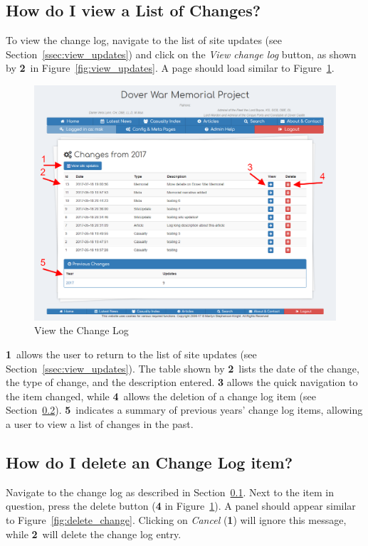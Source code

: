 \documentclass[12pt]{article}
\newcommand{\marker}[1]{\color{red}\textbf{#1}\color{black}}
\begin{document}
\newpage
\FloatBarrier
\subsection{How do I view a List of Changes?}\label{ssec:changeLog}
To view the change log, navigate to the list of site updates (see Section~\ref{ssec:view_updates}) and click on the \textit{View change log} button, as shown by \marker{2}\ in Figure~\ref{fig:view_updates}. A page should load similar to Figure~\ref{fig:view_changes}.

\begin{figure}[h]
  \centering
 \includegraphics[width=.9\textwidth]{pics/view_changes.png}
	\caption{View the Change Log}\label{fig:view_changes}
\end{figure}

\marker{1}\ allows the user to return to the list of site updates (see Section~\ref{ssec:view_updates}). The table shown by \marker{2}\ lists the date of the change, the type of change, and the description entered. \marker{3} allows the quick navigation to the item changed, while \marker{4}\ allows the deletion of a change log item (see Section~\ref{ssec:delete_change}). \marker{5}\ indicates a summary of previous years' change log items, allowing a user to view a list of changes in the past.

\newpage
\FloatBarrier
\subsection{How do I delete an Change Log item?}\label{ssec:delete_change}
Navigate to the change log as described in Section~\ref{ssec:changeLog}. Next to the item in question, press the delete button (\marker{4} in Figure~\ref{fig:view_changes}). A panel should appear similar to Figure~\ref{fig:delete_change}. Clicking on \textit{Cancel} (\marker{1}) will ignore this message, while \marker{2}\ will delete the change log entry.
\end{document}
